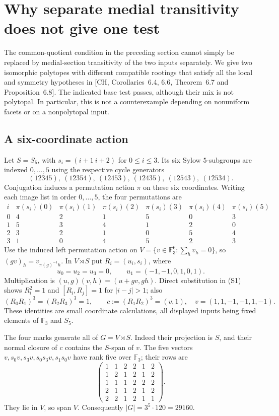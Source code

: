 \section{Why separate medial transitivity does not give one test}
The common-quotient condition in the preceding section cannot simply be
replaced by medial-section transitivity of the two inputs separately.
We give two isomorphic polytopes with different compatible rootings that
satisfy all the local and symmetry hypotheses in [CH, Corollaries~6.4,
6.6, Theorem~6.7 and Proposition~6.8]. The indicated base test passes,
although their mix is not polytopal. In particular, this is not a
counterexample depending on nonuniform facets or on a nonpolytopal input.

\subsection{A six-coordinate action}
Let $S=S_5$, with $s_i=(i+1\ i+2)$ for $0\leq i\leq3$.
Its six Sylow $5$-subgroups are indexed $0,\ldots,5$ using the respective
cycle generators
\[
 (12345),\ (12354),\ (12453),\ (12435),\ (12543),\ (12534).
\]
Conjugation induces a permutation action $\pi$ on these six coordinates.
Writing each image list in order $0,\ldots,5$, the four permutations are
\[
\begin{array}{c|rrrrrr}
i&\pi(s_i)(0)&\pi(s_i)(1)&\pi(s_i)(2)&\pi(s_i)(3)&\pi(s_i)(4)&\pi(s_i)(5)\\\hline
0&4&2&1&5&0&3\\
1&5&3&4&1&2&0\\
2&3&2&1&0&5&4\\
3&1&0&4&5&2&3
\end{array}                                                    \tag{S1}
\]
Use the induced left permutation action on
$V=\{v\in\mathbb F_3^6:\sum_hv_h=0\}$, so $(gv)_h=v_{\pi(g)^{-1}h}$.
In $V\rtimes S$ put $R_i=(u_i,s_i)$, where
\[
 u_0=u_2=u_3=0,\qquad u_1=(-1,-1,0,1,0,1).
\]
Multiplication is $(u,g)(v,h)=(u+gv,gh)$. Direct substitution in (S1)
shows $R_i^2=1$ and $[R_i,R_j]=1$ for $|i-j|>1$; also
\[
 (R_0R_1)^3=(R_2R_3)^3=1,\qquad
 c:=(R_1R_2)^3=(v,1),\quad v=(1,1,-1,-1,1,-1).       \tag{S2}
\]
These identities are small coordinate calculations, all displayed inputs
being fixed elements of $\mathbb F_3$ and $S_5$.

The four marks generate all of $G=V\rtimes S$. Indeed their projection
is $S$, and their normal closure of $c$ contains the $S$-span of $v$.
The five vectors $v,s_0v,s_3v,s_0s_3v,s_1s_0v$ have rank five over
$\mathbb F_3$; their rows are
\[
\begin{pmatrix}
1&1&2&2&1&2\\1&2&1&2&1&2\\1&1&1&2&2&2\\
2&1&1&2&1&2\\2&2&1&2&1&1
\end{pmatrix}.
\]
They lie in $V$, so span $V$. Consequently $|G|=3^5\cdot120=29160$.


